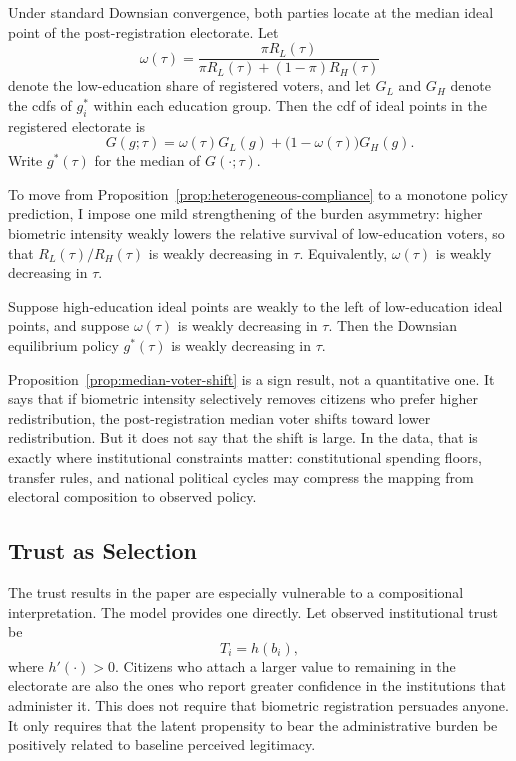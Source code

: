Under standard Downsian convergence, both parties locate at the median ideal point of the post-registration electorate. Let
\begin{equation}
\label{eq:model-low-share}
\omega(\tau)=\frac{\pi R_L(\tau)}{\pi R_L(\tau)+(1-\pi)R_H(\tau)}
\end{equation}
denote the low-education share of registered voters, and let $G_L$ and $G_H$ denote the cdfs of $g_i^\ast$ within each education group. Then the cdf of ideal points in the registered electorate is
\begin{equation}
\label{eq:model-mixture}
G(g;\tau)=\omega(\tau)G_L(g)+\bigl(1-\omega(\tau)\bigr)G_H(g).
\end{equation}
Write $g^\ast(\tau)$ for the median of $G(\cdot;\tau)$.

To move from Proposition~\ref{prop:heterogeneous-compliance} to a monotone policy prediction, I impose one mild strengthening of the burden asymmetry: higher biometric intensity weakly lowers the relative survival of low-education voters, so that $R_L(\tau)/R_H(\tau)$ is weakly decreasing in $\tau$. Equivalently, $\omega(\tau)$ is weakly decreasing in $\tau$.

\begin{proposition}
\label{prop:median-voter-shift}
Suppose high-education ideal points are weakly to the left of low-education ideal points, and suppose $\omega(\tau)$ is weakly decreasing in $\tau$. Then the Downsian equilibrium policy $g^\ast(\tau)$ is weakly decreasing in $\tau$.
\end{proposition}

Proposition~\ref{prop:median-voter-shift} is a sign result, not a quantitative one. It says that if biometric intensity selectively removes citizens who prefer higher redistribution, the post-registration median voter shifts toward lower redistribution. But it does not say that the shift is large. In the data, that is exactly where institutional constraints matter: constitutional spending floors, transfer rules, and national political cycles may compress the mapping from electoral composition to observed policy.

\subsection{Trust as Selection}

The trust results in the paper are especially vulnerable to a compositional interpretation. The model provides one directly. Let observed institutional trust be
\begin{equation}
\label{eq:model-trust}
T_i = h(b_i),
\end{equation}
where $h'(\cdot)>0$. Citizens who attach a larger value to remaining in the electorate are also the ones who report greater confidence in the institutions that administer it. This does not require that biometric registration persuades anyone. It only requires that the latent propensity to bear the administrative burden be positively related to baseline perceived legitimacy.

